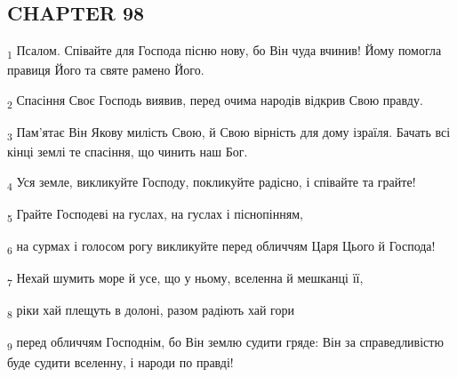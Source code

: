 \subsection{CHAPTER 98}
\begin{tcolorbox}
\textsubscript{1} Псалом. Співайте для Господа пісню нову, бо Він чуда вчинив! Йому помогла правиця Його та святе рамено Його.
\end{tcolorbox}
\begin{tcolorbox}
\textsubscript{2} Спасіння Своє Господь виявив, перед очима народів відкрив Свою правду.
\end{tcolorbox}
\begin{tcolorbox}
\textsubscript{3} Пам'ятає Він Якову милість Свою, й Свою вірність для дому ізраїля. Бачать всі кінці землі те спасіння, що чинить наш Бог.
\end{tcolorbox}
\begin{tcolorbox}
\textsubscript{4} Уся земле, викликуйте Господу, покликуйте радісно, і співайте та грайте!
\end{tcolorbox}
\begin{tcolorbox}
\textsubscript{5} Грайте Господеві на гуслах, на гуслах і піснопінням,
\end{tcolorbox}
\begin{tcolorbox}
\textsubscript{6} на сурмах і голосом рогу викликуйте перед обличчям Царя Цього й Господа!
\end{tcolorbox}
\begin{tcolorbox}
\textsubscript{7} Нехай шумить море й усе, що у ньому, вселенна й мешканці її,
\end{tcolorbox}
\begin{tcolorbox}
\textsubscript{8} ріки хай плещуть в долоні, разом радіють хай гори
\end{tcolorbox}
\begin{tcolorbox}
\textsubscript{9} перед обличчям Господнім, бо Він землю судити гряде: Він за справедливістю буде судити вселенну, і народи по правді!
\end{tcolorbox}
